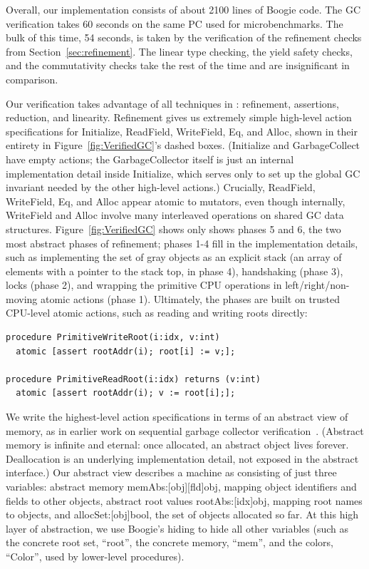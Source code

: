 Overall, our implementation consists of about 2100 lines of Boogie code.
The GC verification takes 60 seconds on the same PC used for microbenchmarks.
The bulk of this time, 54 seconds, is taken by the verification of the refinement checks from Section~\ref{sec:refinement}.
The linear type checking, the yield safety checks, and the commutativity checks take the rest of the time and are insignificant in comparison.

Our verification takes advantage of all techniques in \civl: refinement, assertions, reduction, and linearity.
Refinement gives us extremely simple high-level action specifications for Initialize, ReadField, WriteField, Eq, and Alloc,
shown in their entirety in Figure~\ref{fig:VerifiedGC}'s dashed boxes.
(Initialize and GarbageCollect have empty actions; the GarbageCollector itself is just an internal implementation detail inside Initialize,
which serves only to set up the global GC invariant needed by the other high-level actions.)
Crucially, ReadField, WriteField, Eq, and Alloc appear atomic to mutators, even though internally,
WriteField and Alloc involve many interleaved operations on shared GC data structures.
Figure~\ref{fig:VerifiedGC} shows only shows phases 5 and 6, the two most abstract phases of refinement;
phases 1-4 fill in the implementation details,
such as implementing the set of gray objects as an explicit stack (an array of elements with a pointer to the stack top, in phase 4),
handshaking (phase 3), locks (phase 2), and wrapping the primitive CPU operations in left/right/non-moving atomic actions (phase 1).
Ultimately, the phases are built on trusted CPU-level atomic actions, such as reading and writing roots directly:

\begin{verbatim}
procedure PrimitiveWriteRoot(i:idx, v:int)
  atomic [assert rootAddr(i); root[i] := v;];

procedure PrimitiveReadRoot(i:idx) returns (v:int)
  atomic [assert rootAddr(i); v := root[i];];
\end{verbatim}

We write the highest-level action specifications in terms of an abstract view of memory,
as in earlier work on sequential garbage collector verification~\cite{mccr07,hawb09}.
(Abstract memory is infinite and eternal: once allocated, an abstract object lives forever.
Deallocation is an underlying implementation detail, not exposed in the abstract interface.)
Our abstract view describes a machine as consisting of just three variables:
abstract memory memAbs:[obj][fld]obj, mapping object identifiers and fields to other objects,
abstract root values rootAbs:[idx]obj, mapping root names to objects, and
allocSet:[obj]bool, the set of objects allocated so far.
At this high layer of abstraction, we use Boogie's hiding to hide all other variables
(such as the concrete root set, ``root'', the concrete memory, ``mem'', and the colors, ``Color'', used by lower-level procedures).

